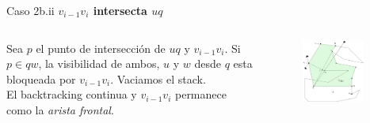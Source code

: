 \documentclass[aspectratio=169,xcolor=dvipsnames, t]{beamer}
\begin{document}
\begin{frame}{Caso 2b.ii}
  \textbf{$v_{i-1}v_{i}$ intersecta $uq$}\\
  \vspace{0.5cm}
  \begin{columns}
    \begin{column}{0.45\textwidth}
      Sea $p$ el punto de intersección de $uq$ y $v_{i-1}v_{i}$. Si $p \in qw$, la visibilidad de ambos, $u$ y $w$ desde $q$ esta bloqueada por $v_{i-1}v_{i}$. Vaciamos el stack.\\
      \vspace{0.5cm}
      El backtracking continua y $v_{i-1}v_{i}$ permanece como la \textit{arista frontal}.\\
      \vspace{0.5cm}
    \end{column}
    \begin{column}{0.45\textwidth}  %
      \vspace{-3cm}
      \begin{figure}
        \centering
        \includegraphics[width=0.85\textwidth]{imagenes/Caso2.7a.png}
      \end{figure}
    \end{column}
  \end{columns}
\end{frame}

\end{document}

